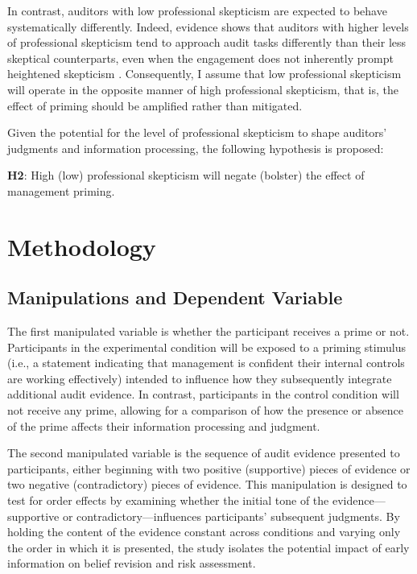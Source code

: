 \documentclass[12pt,english]{article}
\begin{document}
In contrast, auditors with low professional skepticism are expected to behave systematically differently. Indeed, evidence shows that auditors with higher levels of professional skepticism tend to approach audit tasks differently than their less skeptical counterparts, even when the engagement does not inherently prompt heightened skepticism \citep{hurtt2008}. Consequently, I assume that low professional skepticism will operate in the opposite manner of high professional skepticism, that is, the effect of priming should be amplified rather than mitigated.

Given the potential for the level of professional skepticism to shape auditors’ judgments and information processing, the following hypothesis is proposed:

\begin{center}
    \textbf{H2}: High (low) professional skepticism will negate (bolster) the effect of management priming.
\end{center}


\section{Methodology}
\subsection{Manipulations and Dependent Variable}
The first manipulated variable is whether the participant receives a prime or not. Participants in the experimental condition will be exposed to a priming stimulus (i.e., a statement indicating that management is confident their internal controls are working effectively) intended to influence how they subsequently integrate additional audit evidence. In contrast, participants in the control condition will not receive any prime, allowing for a comparison of how the presence or absence of the prime affects their information processing and judgment.

The second manipulated variable is the sequence of audit evidence presented to participants, either beginning with two positive (supportive) pieces of evidence or two negative (contradictory) pieces of evidence. This manipulation is designed to test for order effects by examining whether the initial tone of the evidence—supportive or contradictory—influences participants’ subsequent judgments. By holding the content of the evidence constant across conditions and varying only the order in which it is presented, the study isolates the potential impact of early information on belief revision and risk assessment.
\end{document}
